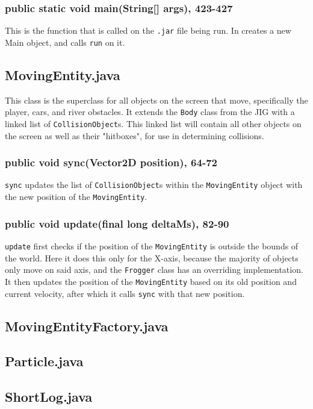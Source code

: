 \documentclass[12pt]{article}
\begin{document}
\subsubsection{public static void main(String[] args), 423-427}
This is the function that is called on the \verb|.jar| file being run.
In creates a new Main object, and calls \verb|run| on it.

\subsection{MovingEntity.java}
This class is the superclass for all objects on the screen that move, specifically the player, cars, and river obstacles.
It extends the \verb|Body| class from the JIG with a linked list of \verb|CollisionObject|s.
This linked list will contain all other objects on the screen as well as their "hitboxes", for use in determining collisions.

\subsubsection{public void sync(Vector2D position), 64-72}
\verb|sync| updates the list of \verb|CollisionObject|s within the \verb|MovingEntity| object with the new position of the \verb|MovingEntity|.

\subsubsection{public void update(final long deltaMs), 82-90}
\verb|update| first checks if the position of the \verb|MovingEntity| is outside the bounds of the world.
Here it does this only for the X-axis, because the majority of objects only move on said axis, and the \verb|Frogger| class has an overriding implementation.
It then updates the position of the \verb|MovingEntity| based on its old position and current velocity, after which it calls \verb|sync| with that new position.

\subsection{MovingEntityFactory.java}

\subsection{Particle.java}

\subsection{ShortLog.java}
\end{document}
